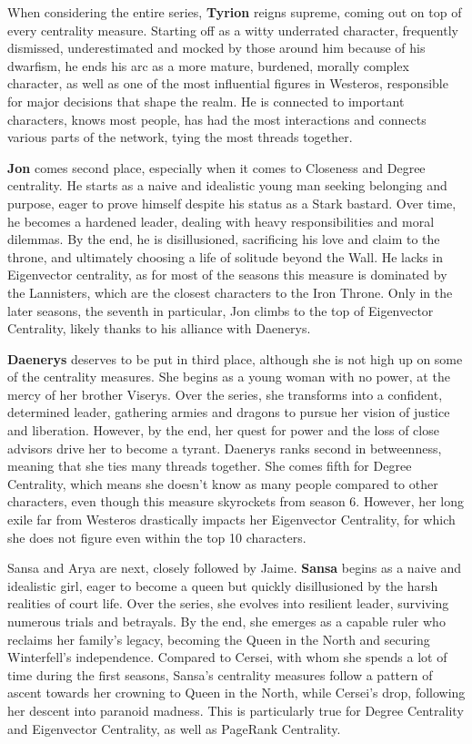 \documentclass[10pt,twocolumn,letterpaper]{article}
\begin{document}
When considering the entire series, \textbf{Tyrion} reigns supreme, coming out on top of every centrality measure. Starting off as a witty underrated character, frequently dismissed, underestimated and mocked by those around him because of his dwarfism, he ends his arc as a more mature, burdened, morally complex character, as well as one of the most influential figures in Westeros, responsible for major decisions that shape the realm. He is connected to important characters, knows most people, has had the most interactions and connects various parts of the network, tying the most threads together.

\textbf{Jon} comes second place, especially when it comes to Closeness and Degree centrality. He starts as a naive and idealistic young man seeking belonging and purpose, eager to prove himself despite his status as a Stark bastard. Over time, he becomes a hardened leader, dealing with heavy responsibilities and moral dilemmas. By the end, he is disillusioned, sacrificing his love and claim to the throne, and ultimately choosing a life of solitude beyond the Wall. He lacks in Eigenvector centrality, as for most of the seasons this measure is dominated by the Lannisters, which are the closest characters to the Iron Throne. Only in the later seasons, the seventh in particular, Jon climbs to the top of Eigenvector Centrality, likely thanks to his alliance with Daenerys.

\textbf{Daenerys} deserves to be put in third place, although she is not high up on some of the centrality measures. She begins as a young woman with no power, at the mercy of her brother Viserys. Over the series, she transforms into a confident, determined leader, gathering armies and dragons to pursue her vision of justice and liberation. However, by the end, her quest for power and the loss of close advisors drive her to become a tyrant. Daenerys ranks second in betweenness, meaning that she ties many threads together. She comes fifth for Degree Centrality, which means she doesn't know as many people compared to other characters, even though this measure skyrockets from season 6. However, her long exile far from Westeros drastically impacts her Eigenvector Centrality, for which she does not figure even within the top 10 characters.

Sansa and Arya are next, closely followed by Jaime. \textbf{Sansa} begins as a naive and idealistic girl, eager to become a queen but quickly disillusioned by the harsh realities of court life. Over the series, she evolves into resilient leader, surviving numerous trials and betrayals. By the end, she emerges as a capable ruler who reclaims her family’s legacy, becoming the Queen in the North and securing Winterfell's independence. Compared to Cersei, with whom she spends a lot of time during the first seasons, Sansa's centrality measures follow a pattern of ascent towards her crowning to Queen in the North, while Cersei's drop, following her descent into paranoid madness. This is particularly true for Degree Centrality and Eigenvector Centrality, as well as PageRank Centrality.
\end{document}
